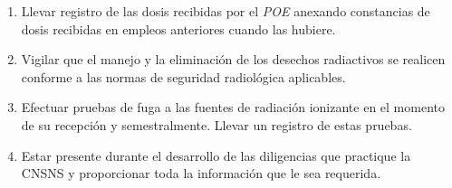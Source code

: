 \begin{enumerate}
    \item Llevar registro de las dosis recibidas por el \textit{POE} anexando constancias de dosis recibidas en empleos anteriores cuando las hubiere.
    
    \item Vigilar que el manejo y la eliminación de los desechos radiactivos se realicen conforme a las normas de seguridad radiológica aplicables.
    
    \item Efectuar pruebas de fuga a las fuentes de radiación ionizante en el momento de su recepción y semestralmente. Llevar un registro de estas pruebas.
    
    \item Estar presente durante el desarrollo de las diligencias que practique la CNSNS y proporcionar toda la información que le sea requerida.
\end{enumerate}